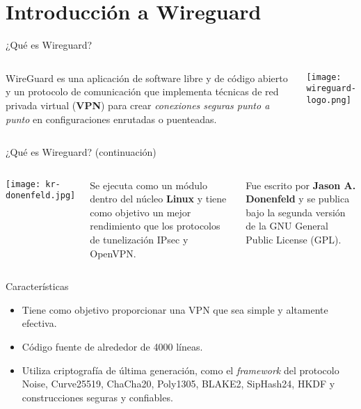 
\section{Introducción a Wireguard}

\begin{frame}[c]{¿Qué es Wireguard?}
    \begin{columns}
        WireGuard es una aplicación de software libre y de código abierto
        y un protocolo de comunicación que implementa técnicas de red
        privada virtual (\textbf{VPN}) para crear \emph{conexiones seguras
        punto a punto} en configuraciones enrutadas o puenteadas.
        \begin{center}
            \texttt{[image: wireguard-logo.png]}
        \end{center}
    \end{columns}
\end{frame}

\begin{frame}[c]{¿Qué es Wireguard? (continuación)}
    \begin{columns}
        \begin{center}
            \texttt{[image: kr-donenfeld.jpg]}
        \end{center}
        Se ejecuta como un módulo dentro del núcleo \textbf{Linux} y tiene
        como objetivo un mejor rendimiento que los protocolos de tunelización
        IPsec y OpenVPN.

        \vspace{\baselineskip}
        Fue escrito por \textbf{Jason A. Donenfeld} y se publica bajo la
        segunda versión de la GNU General Public License (GPL).
    \end{columns}
\end{frame}

\begin{frame}[c]{Características}
  \begin{itemize}
    \item Tiene como objetivo proporcionar una VPN que sea
          simple y altamente efectiva.
    \pausa
    \item Código fuente de alrededor de 4000 líneas.
    \pausa
    \item Utiliza criptografía de última generación, como el \emph{framework}
          del protocolo Noise, Curve25519, ChaCha20, Poly1305, BLAKE2,
          SipHash24, HKDF y construcciones seguras y confiables.

  \end{itemize}
\end{frame}

